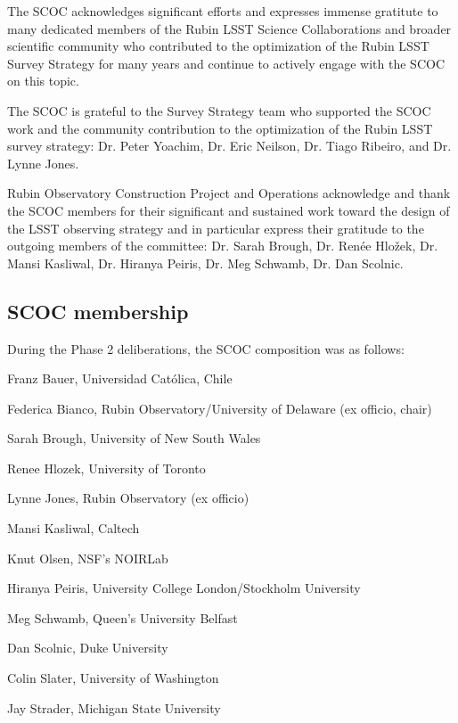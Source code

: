 The SCOC acknowledges significant efforts and expresses immense gratitute to many dedicated members of the Rubin LSST Science Collaborations and broader scientific community who contributed to the optimization of the Rubin LSST Survey Strategy for many years and continue to actively engage with the SCOC on this topic. 

The SCOC is grateful to the Survey Strategy team who supported the SCOC work and the community contribution to the optimization of the Rubin LSST survey strategy: 
Dr. Peter Yoachim, 
Dr. Eric Neilson,
Dr. Tiago Ribeiro, and Dr. Lynne Jones.

Rubin Observatory Construction Project and Operations acknowledge and thank the SCOC members for their significant and sustained   work toward the design of the LSST observing strategy and in particular express their gratitude to the outgoing members of the committee: Dr. Sarah Brough, Dr. Renée Hložek, Dr. Mansi Kasliwal, Dr. Hiranya Peiris, Dr. Meg Schwamb, Dr. Dan Scolnic.

\subsection{SCOC membership}

During the Phase 2 deliberations, the SCOC composition was as follows:

 Franz Bauer, Universidad Católica, Chile

 Federica Bianco, Rubin Observatory/University of Delaware (ex officio, chair)

 Sarah Brough, University of New South Wales 

 Renee Hlozek, University of Toronto


 Lynne Jones, Rubin Observatory (ex officio)

 Mansi Kasliwal, Caltech 

 Knut Olsen, NSF’s NOIRLab 

 Hiranya Peiris, University College London/Stockholm University

 Meg Schwamb, Queen's University Belfast

 Dan Scolnic, Duke University

 Colin Slater, University of Washington  

 Jay Strader, Michigan State University

